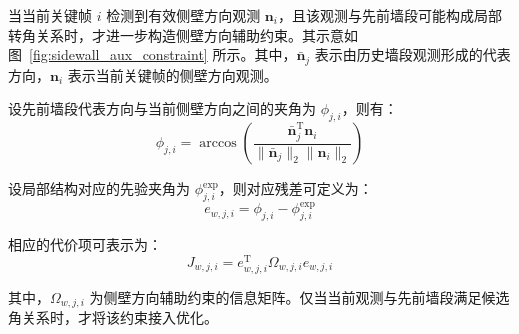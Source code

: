 当当前关键帧 $i$ 检测到有效侧壁方向观测 $\mathbf{n}_i$，且该观测与先前墙段可能构成局部转角关系时，才进一步构造侧壁方向辅助约束。其示意如图~\ref{fig:sidewall_aux_constraint} 所示。其中，$\bar{\mathbf{n}}_j$ 表示由历史墙段观测形成的代表方向，$\mathbf{n}_i$ 表示当前关键帧的侧壁方向观测。

设先前墙段代表方向与当前侧壁方向之间的夹角为 $\phi_{j,i}$，则有：
\begin{equation}
\phi_{j,i}=
\arccos
\left(
\frac{
\bar{\mathbf{n}}_j^{\mathrm T}\mathbf{n}_i
}{
\|\bar{\mathbf{n}}_j\|_2\|\mathbf{n}_i\|_2
}
\right)
\end{equation}

设局部结构对应的先验夹角为 $\phi_{j,i}^{\mathrm{exp}}$，则对应残差可定义为：
\begin{equation}
e_{w,j,i}=\phi_{j,i}-\phi_{j,i}^{\mathrm{exp}}
\end{equation}

相应的代价项可表示为：
\begin{equation}
J_{w,j,i}=e_{w,j,i}^{\mathrm T}\Omega_{w,j,i}e_{w,j,i}
\end{equation}

其中，$\Omega_{w,j,i}$ 为侧壁方向辅助约束的信息矩阵。仅当当前观测与先前墙段满足候选角关系时，才将该约束接入优化。

